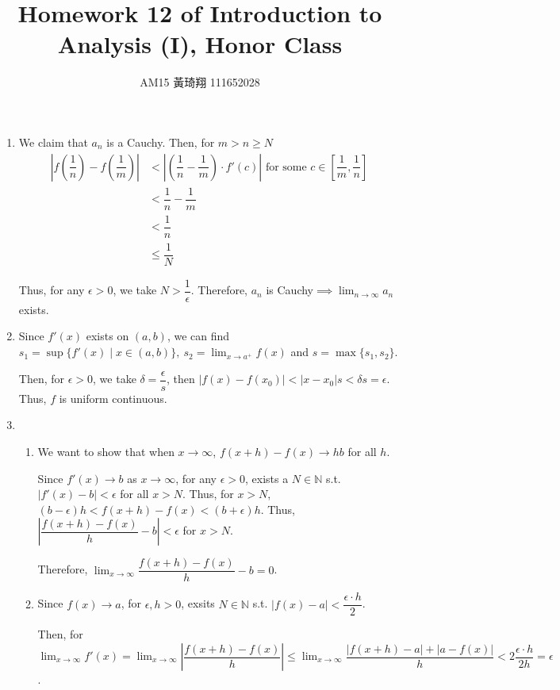 \documentclass[12pt]{article}
\title{Homework 12 of Introduction to Analysis (I), Honor Class}
\author{AM15 黃琦翔 111652028}
\begin{document}
\maketitle
\begin{enumerate}
    \item We claim that $a_n$ is a Cauchy. 
    Then, for $m > n\geq N$
    \begin{align*}
        |f(\dfrac{1}{n}) - f(\dfrac{1}{m})| &< |(\dfrac{1}{n} - \dfrac{1}{m})\cdot f'(c)| \text{ for some } c\in [\dfrac{1}{m}, \dfrac{1}{n}]\\
        &< \dfrac{1}{n} - \dfrac{1}{m}\\
        &< \dfrac{1}{n}\\
        &\leq \dfrac{1}{N}
    \end{align*}

    Thus, for any $\epsilon > 0$, we take $N > \dfrac{1}{\epsilon}$.
    Therefore, $a_n$ is Cauchy$\implies \displaystyle\lim_{n\to\infty} a_n$ exists.

    \item Since $f'(x)$ exists on $(a, b)$, we can find $s_1 = \sup\{f'(x) \mid x\in (a, b)\},\ s_2 = \displaystyle\lim_{x\to a^+} f(x)$ and $s = \max\{ s_1, s_2\}$.
    
    Then, for $\epsilon > 0$, we take $\delta = \dfrac{\epsilon}{s}$, then $|f(x) - f(x_0)| < |x - x_0| s < \delta s= \epsilon$.
    Thus, $f$ is uniform continuous.

    \item \begin{enumerate}
        \item We want to show that when $x\to \infty$, $f(x+h)-f(x) \to hb$ for all $h$.
        
        Since $f'(x) \to b$ as $x\to \infty$, for any $\epsilon > 0$, exists a $N\in \mathbb{N}$ s.t. $|f'(x) - b| < \epsilon$ for all $x > N$.
        Thus, for $x > N$, $(b - \epsilon)h < f(x + h) - f(x) < (b + \epsilon)h$. Thus, $|\dfrac{f(x + h) - f(x)}{h} - b| < \epsilon$ for $x > N$.

        Therefore, $\displaystyle\lim_{x\to\infty} \dfrac{f(x + h) - f(x)}{h} - b = 0$.

        \item Since $f(x) \to a$, for $\epsilon, h> 0$, exsits $N\in\mathbb{N}$ s.t. $|f(x) - a| < \dfrac{\epsilon \cdot h}{2}$.
        
        Then, for $\displaystyle\lim_{x\to\infty} f'(x) = \displaystyle\lim_{x\to\infty} |\dfrac{f(x + h)-f(x)}{h}| \leq \displaystyle\lim_{x\to\infty} \dfrac{|f(x + h) - a| + |a - f(x)|}{h} < 2\dfrac{\epsilon\cdot h}{2h} = \epsilon$.


\end{enumerate}
\end{enumerate}
\end{document}

